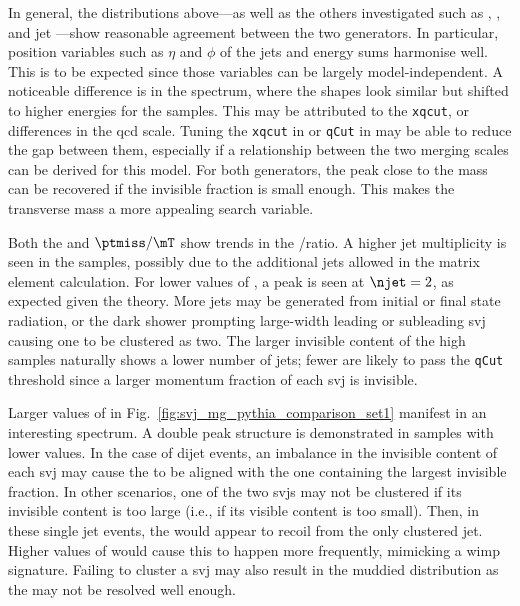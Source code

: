 In general, the distributions above---as well as the others investigated such as \ptmiss, \mht, and \gls{jet} \pt---show reasonable agreement between the two generators. In particular, position variables such as $\eta$ and $\phi$ of the \glspl{jet} and energy sums harmonise well. This is to be expected since those variables can be largely model-independent. A noticeable difference is in the \mT spectrum, where the shapes look similar but shifted to higher energies for the \MADGRAPH samples. This may be attributed to the \texttt{xqcut}, or differences in the \acrshort{qcd} scale. Tuning the \texttt{xqcut} in \MADGRAPH or \texttt{qCut} in \PYTHIA may be able to reduce the gap between them, especially if a relationship between the two merging scales can be derived for this model. For both generators, the peak close to the \PZprime mass can be recovered if the invisible fraction is small enough. This makes the transverse mass a more appealing search variable.

Both the \njet and $\ptmiss/\mT$ show trends in the \MADGRAPH/\PYTHIA ratio. A higher \gls{jet} multiplicity is seen in the \MADGRAPH samples, possibly due to the additional \glspl{jet} allowed in the matrix element calculation. For lower values of \rinv, a peak is seen at $\njet = \text{2}$, as expected given the theory. More \glspl{jet} may be generated from initial or final state radiation, or the dark shower prompting large-width leading or subleading \gls{svj} causing one to be clustered as two. The larger invisible content of the high \rinv samples naturally shows a lower number of \glspl{jet}; fewer are likely to pass the \texttt{qCut} threshold since a larger momentum fraction of each \gls{svj} is invisible.

Larger values of \rinv in Fig.~\ref{fig:svj_mg_pythia_comparison_set1} manifest in an interesting \mindphi spectrum. A double peak structure is demonstrated in samples with lower values. In the case of dijet events, an imbalance in the invisible content of each \gls{svj} may cause the \ptmiss to be aligned with the one containing the largest invisible fraction. In other scenarios, one of the two \glspl{svj} may not be clustered if its invisible content is too large (i.e., if its visible content is too small). Then, in these single \gls{jet} events, the \ptmiss would appear to recoil from the only clustered jet. Higher values of \rinv would cause this to happen more frequently, mimicking a \acrshort{wimp} signature. Failing to cluster a \gls{svj} may also result in the muddied \mT distribution as the \ptmiss may not be resolved well enough.

